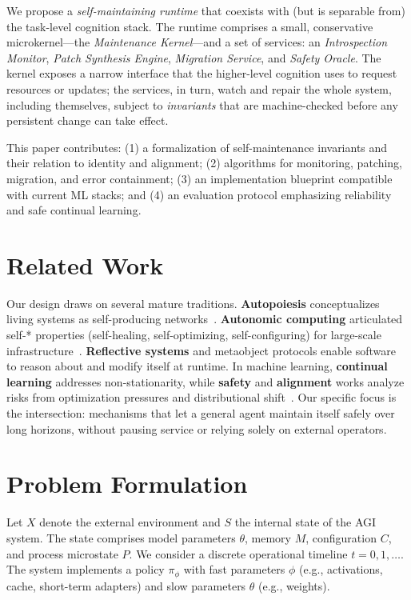 \documentclass[12pt]{article}
\begin{document}
We propose a \emph{self-maintaining runtime} that coexists with (but is separable from) the task-level cognition stack. The runtime comprises a small, conservative microkernel---the \emph{Maintenance Kernel}---and a set of services: an \emph{Introspection Monitor}, \emph{Patch Synthesis Engine}, \emph{Migration Service}, and \emph{Safety Oracle}. The kernel exposes a narrow interface that the higher-level cognition uses to request resources or updates; the services, in turn, watch and repair the whole system, including themselves, subject to \emph{invariants} that are machine-checked before any persistent change can take effect.

This paper contributes: (1) a formalization of self-maintenance invariants and their relation to identity and alignment; (2) algorithms for monitoring, patching, migration, and error containment; (3) an implementation blueprint compatible with current ML stacks; and (4) an evaluation protocol emphasizing reliability and safe continual learning.

\section{Related Work}
Our design draws on several mature traditions. \textbf{Autopoiesis} conceptualizes living systems as self-producing networks~\cite{maturana1972}. \textbf{Autonomic computing} articulated self-* properties (self-healing, self-optimizing, self-configuring) for large-scale infrastructure~\cite{ibm2001}. \textbf{Reflective systems} and metaobject protocols enable software to reason about and modify itself at runtime. In machine learning, \textbf{continual learning} addresses non-stationarity, while \textbf{safety} and \textbf{alignment} works analyze risks from optimization pressures and distributional shift~\cite{bostrom2014}. Our specific focus is the intersection: mechanisms that let a general agent maintain itself safely over long horizons, without pausing service or relying solely on external operators.

\section{Problem Formulation}
Let $X$ denote the external environment and $S$ the internal state of the AGI system. The state comprises model parameters $\theta$, memory $M$, configuration $C$, and process microstate $P$. We consider a discrete operational timeline $t=0,1,\dots$. The system implements a policy $\pi_\phi$ with fast parameters $\phi$ (e.g., activations, cache, short-term adapters) and slow parameters $\theta$ (e.g., weights).
\end{document}
